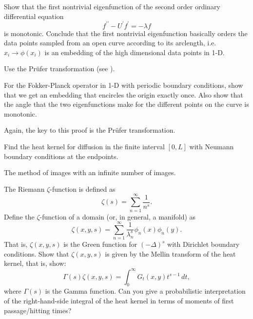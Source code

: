 \begin{myexercise}
Show that the first nontrivial eigenfunction of the second order ordinary differential equation $$f^{\prime \prime} - U^\prime f^\prime = -\lambda f$$ 
is monotonic. Conclude that the first nontrivial eigenfunction basically orders the data points sampled from an open curve according to its arclength, i.e. $x_i \rightarrow \phi(x_i)$ is an embedding of the high dimensional data points in 1-D.
 
\begin{hint}
Use the Pr\"ufer transformation (see \cite{coddington_levinson}). 
\end{hint}
\end{myexercise}

\begin{myexercise}
For the Fokker-Planck operator in 1-D with periodic boundary conditions, show that we get an embedding that encircles the origin exactly once.
Also show that the angle that the two eigenfunctions make for the different points on the curve is monotonic.
\begin{hint}
Again, the key to this proof is the Pr\"ufer transformation.   
\end{hint}
\end{myexercise}

\begin{myexercise}
Find the heat kernel for diffusion in the finite interval $[0,L]$ with Neumann boundary conditions at the endpoints. 
\begin{hint}
The method of images with an infinite number of images. 
\end{hint}     
\end{myexercise}

\begin{myexercise}
The Riemann $\zeta$-function is defined as
$$\zeta(s) = \sum_{n=1}^\infty \frac{1}{n^s}.$$
Define the $\zeta$-function of a domain (or, in general, a manifold) as
$$\zeta(x,y,s) = \sum_{n=1}^\infty \frac{1}{\lambda_n^s}\phi_n(x)\phi_n(y).$$
That is, $\zeta(x,y,s)$ is the Green function for $(-\Delta)^s$ with Dirichlet boundary conditions.
Show that $\zeta(x,y,s)$ is given by the Mellin transform of the heat kernel, that is, show:
$$\Gamma(s) \zeta(x,y,s) = \int_0^\infty G_t(x,y) t^{s-1}\,dt,$$
where $\Gamma(s)$ is the Gamma function. Can you give a probabilistic interpretation of the right-hand-side integral of the heat kernel in terms of moments of first passage/hitting times?    
\end{myexercise}


